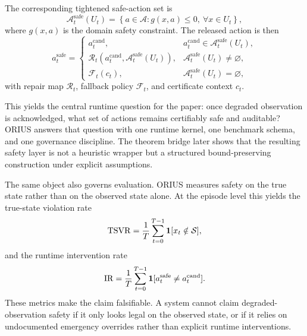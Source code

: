 The corresponding tightened safe-action set is
\begin{equation}
  \mathcal{A}^{\mathrm{safe}}_t(U_t)
  =
  \left\{
    a \in \mathcal{A} :
    g(x,a) \le 0,\ \forall x \in U_t
  \right\},
\end{equation}
where \(g(x,a)\) is the domain safety constraint. The released action is then
\begin{equation}
  a_t^{\mathrm{safe}}
  =
  \begin{cases}
    a_t^{\mathrm{cand}}, & a_t^{\mathrm{cand}} \in \mathcal{A}^{\mathrm{safe}}_t(U_t), \\
    \mathcal{R}_t(a_t^{\mathrm{cand}}, \mathcal{A}^{\mathrm{safe}}_t(U_t)), &
      \mathcal{A}^{\mathrm{safe}}_t(U_t) \neq \varnothing, \\
    \mathcal{F}_t(c_t), & \mathcal{A}^{\mathrm{safe}}_t(U_t) = \varnothing,
  \end{cases}
\end{equation}
with repair map \(\mathcal{R}_t\), fallback policy \(\mathcal{F}_t\), and certificate
context \(c_t\).

This yields the central runtime question for the paper: once degraded observation is
acknowledged, what set of actions remains certifiably safe and auditable? ORIUS answers
that question with one runtime kernel, one benchmark schema, and one governance
discipline. The theorem bridge later shows that the resulting safety layer is not a
heuristic wrapper but a structured bound-preserving construction under explicit
assumptions.

The same object also governs evaluation. ORIUS measures safety on the true state rather
than on the observed state alone. At the episode level this yields the true-state
violation rate
\begin{equation}
  \mathrm{TSVR}
  =
  \frac{1}{T} \sum_{t=0}^{T-1} \mathbf{1}[x_t \notin \mathcal{S}],
\end{equation}
and the runtime intervention rate
\begin{equation}
  \mathrm{IR}
  =
  \frac{1}{T} \sum_{t=0}^{T-1} \mathbf{1}[a_t^{\mathrm{safe}} \neq a_t^{\mathrm{cand}}].
\end{equation}
These metrics make the claim falsifiable. A system cannot claim degraded-observation
safety if it only looks legal on the observed state, or if it relies on undocumented
emergency overrides rather than explicit runtime interventions.


